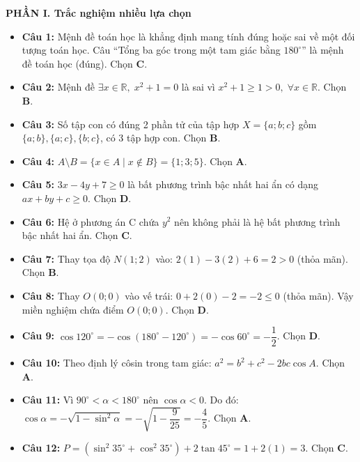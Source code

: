 \documentclass[12pt,a4paper]{article}
\begin{document}
\textbf{PHẦN I. Trắc nghiệm nhiều lựa chọn}
\begin{itemize}[leftmargin=0.6cm, itemsep=3pt]
    \item \textbf{Câu 1:} Mệnh đề toán học là khẳng định mang tính đúng hoặc sai về một đối tượng toán học. Câu ``Tổng ba góc trong một tam giác bằng $180^\circ$'' là mệnh đề toán học (đúng). Chọn \textbf{C}.
    \item \textbf{Câu 2:} Mệnh đề $\exists x \in \mathbb{R},\; x^2 + 1 = 0$ là sai vì $x^2 + 1 \ge 1 > 0,\; \forall x \in \mathbb{R}$. Chọn \textbf{B}.
    \item \textbf{Câu 3:} Số tập con có đúng 2 phần tử của tập hợp $X = \{a; b; c\}$ gồm $\{a; b\}, \{a; c\}, \{b; c\}$, có 3 tập hợp con. Chọn \textbf{B}.
    \item \textbf{Câu 4:} $A \setminus B = \{x \in A \mid x \notin B\} = \{1; 3; 5\}$. Chọn \textbf{A}.
    \item \textbf{Câu 5:} $3x - 4y + 7 \ge 0$ là bất phương trình bậc nhất hai ẩn có dạng $ax + by + c \ge 0$. Chọn \textbf{D}.
    \item \textbf{Câu 6:} Hệ ở phương án C chứa $y^2$ nên không phải là hệ bất phương trình bậc nhất hai ẩn. Chọn \textbf{C}.
    \item \textbf{Câu 7:} Thay tọa độ $N(1; 2)$ vào: $2(1) - 3(2) + 6 = 2 > 0$ (thỏa mãn). Chọn \textbf{B}.
    \item \textbf{Câu 8:} Thay $O(0; 0)$ vào vế trái: $0 + 2(0) - 2 = -2 \le 0$ (thỏa mãn). Vậy miền nghiệm chứa điểm $O(0; 0)$. Chọn \textbf{D}.
    \item \textbf{Câu 9:} $\cos 120^\circ = -\cos(180^\circ - 120^\circ) = -\cos 60^\circ = -\dfrac{1}{2}$. Chọn \textbf{D}.
    \item \textbf{Câu 10:} Theo định lý côsin trong tam giác: $a^2 = b^2 + c^2 - 2bc \cos A$. Chọn \textbf{A}.
    \item \textbf{Câu 11:} Vì $90^\circ < \alpha < 180^\circ$ nên $\cos \alpha < 0$. Do đó:
    $\cos \alpha = -\sqrt{1 - \sin^2 \alpha} = -\sqrt{1 - \dfrac{9}{25}} = -\dfrac{4}{5}$. Chọn \textbf{A}.
    \item \textbf{Câu 12:} $P = (\sin^2 35^\circ + \cos^2 35^\circ) + 2\tan 45^\circ = 1 + 2(1) = 3$. Chọn \textbf{C}.
\end{itemize}
\end{document}
